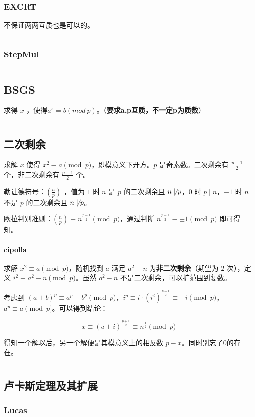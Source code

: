 \documentclass[a4paper,11pt]{article}
\begin{document}
\subsubsection{EXCRT}
不保证两两互质也是可以的。
\inputminted[linenos]{c++}{math/excrt.cpp}
\subsubsection{StepMul}
\inputminted[linenos]{c++}{math/quickmul.cpp}
\subsection{BSGS}
求得 \(x\)
，使得\(a^x=b(mod\ p)\)。（\textbf{要求a,p互质，不一定p为质数}）
\inputminted[linenos]{c++}{math/bsgs.cpp}

\subsection{二次剩余}
求解 \(x\) 使得 \(x^2 \equiv a \pmod p\)，即模意义下开方。\(p\)
是奇素数。二次剩余有 \(\frac{p-1}{2}\) 个，非二次剩余有
\(\frac{p-1}{2}\) 个。

勒让德符号：\(\left(\frac{n}{p}\right)\) ，值为 \(1\) 时 \(n\) 是 \(p\)
的二次剩余且 \(n\not\mid p\)，\(0\) 时 \(p\mid n\)，\(-1\) 时 \(n\) 不是
\(p\) 的二次剩余且 \(n\not\mid p\)。

欧拉判别准则：\(\left(\frac{n}{p}\right)\equiv n^{\frac{p-1}{2}}\pmod p\)，通过判断
\(n^{\frac{p-1}{2}}\equiv \pm 1 \pmod p\) 即可得知。
\paragraph{cipolla}
求解 \(x^2\equiv a\pmod p\)，随机找到 \(a\) 满足 \(a^2-n\)
为\textbf{非二次剩余}（期望为 \(2\) 次），定义
\(i^2\equiv a^2-n\pmod p\)。虽然 \(a^2-n\)
不是二次剩余，可以扩范围到复数。

考虑到
\((a+b)^p\equiv a^p+b^p\pmod p\)，\(i^p\equiv i\cdot (i^2)^{\frac{p-1}{2}}\equiv -i\pmod p\)，\(a^p\equiv a \pmod p\)。可以得到结论：

\[x\equiv (a+i)^{\frac{p+1}{2}}\equiv n^{\frac{1}{2}}\pmod p\]

得知一个解以后，另一个解便是其模意义上的相反数 \(p-x\)。同时别忘了0的存在。
\inputminted[linenos,breaklines]{c++}{math/cipolla.cpp}
\subsection{卢卡斯定理及其扩展}
\subsubsection{Lucas}
\end{document}
